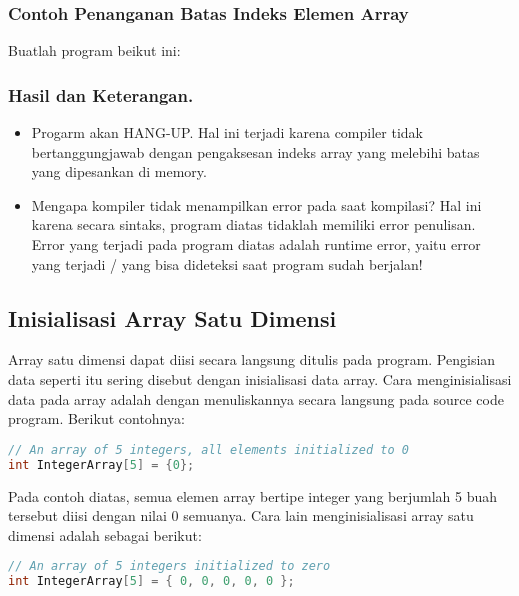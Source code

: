 \subsubsection*{Contoh  Penanganan Batas Indeks Elemen Array}

Buatlah program beikut ini:



\subsubsection*{Hasil dan Keterangan.}

\begin{itemize}

\item
  Progarm akan HANG-UP. Hal ini terjadi karena compiler tidak
  bertanggungjawab dengan pengaksesan indeks array yang melebihi batas
  yang dipesankan di memory.
\item
  Mengapa kompiler tidak menampilkan error pada saat kompilasi? Hal ini
  karena secara sintaks, program diatas tidaklah memiliki error
  penulisan. Error yang terjadi pada program diatas adalah runtime
  error, yaitu error yang terjadi / yang bisa dideteksi saat program
  sudah berjalan!
\end{itemize}

\subsection{Inisialisasi Array Satu Dimensi}\label{inisialisasi-array-satu-dimensi}

Array satu dimensi dapat diisi secara langsung ditulis pada program.
Pengisian data seperti itu sering disebut dengan inisialisasi data
array. Cara menginisialisasi data pada array adalah dengan menuliskannya
secara langsung pada source code program. Berikut contohnya:

\begin{lstlisting}[language=c++, numbers=none]
// An array of 5 integers, all elements initialized to 0
int IntegerArray[5] = {0};
\end{lstlisting}

Pada contoh diatas, semua elemen array bertipe integer yang berjumlah 5
buah tersebut diisi dengan nilai 0 semuanya. Cara lain menginisialisasi
array satu dimensi adalah sebagai berikut:

\begin{lstlisting}[language=c++, numbers=none]
// An array of 5 integers initialized to zero
int IntegerArray[5] = { 0, 0, 0, 0, 0 };
\end{lstlisting}

